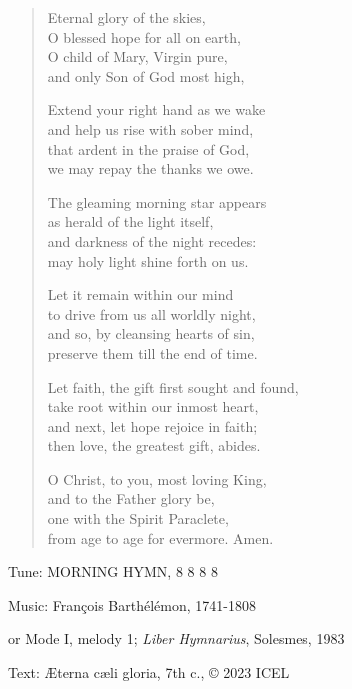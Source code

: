\hymn

\begin{verse}
Eternal glory of the skies,\\
O blessed hope for all on earth,\\
O child of Mary, Virgin pure,\\
and only Son of God most high,

Extend your right hand as we wake\\
and help us rise with sober mind,\\
that ardent in the praise of God,\\
we may repay the thanks we owe.

The gleaming morning star appears\\
as herald of the light itself,\\
and darkness of the night recedes:\\
may holy light shine forth on us.

Let it remain within our mind\\
to drive from us all worldly night,\\
and so, by cleansing hearts of sin,\\
preserve them till the end of time.

Let faith, the gift first sought and found,\\
take root within our inmost heart,\\
and next, let hope rejoice in faith;\\
then love, the greatest gift, abides.

O Christ, to you, most loving King,\\
and to the Father glory be,\\
one with the Spirit Paraclete,\\
from age to age for evermore. Amen.
\end{verse}

\begin{hymnsource}
Tune: MORNING HYMN, 8 8 8 8

Music: François Barthélémon, 1741-1808

or Mode I, melody 1; \emph{Liber Hymnarius}, Solesmes, 1983

Text: Æterna cæli gloria, 7th c., © 2023 ICEL
\end{hymnsource}